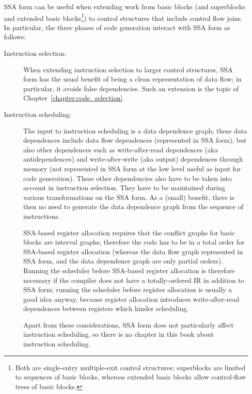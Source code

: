 SSA form can be useful when extending work from basic blocks (and
superblocks and extended basic blocks\footnote{Both are single-entry
  multiple-exit control structures; superblocks are limited to
  sequences of basic blocks, whereas extended basic blocks allow
  control-flow trees of basic blocks.}) to control structures that
include control flow joins.  In particular, the three phases of code
generation interact with SSA form as follows:

\begin{description}

\item[Instruction selection:] When extending instruction selection to
  larger control structures, SSA form has the usual benefit of being a
  clean representation of data flow; in particular, it avoids false
  dependencies.  Such an extension is the topic of
  Chapter~\ref{chapter:code_selection}.

\item[Instruction scheduling:] The input to instruction scheduling is
  a data dependence graph; these data dependences include data flow
  dependences (represented in SSA form), but also other dependences
  such as write-after-read dependences (aka antidependences) and
  write-after-write (aka output) dependences through memory (not
  represented in SSA form at the low level useful as input for code
  generation).  These other dependencies also have to be taken into
  account in instruction selection.  They have to be maintained during
  various transformations on the SSA form.  As a (small) benefit,
  there is then no need to generate the data dependence graph from the
  sequence of instructions.

  SSA-based register allocation requires that the conflict graphs for
  basic blocks are interval graphs; therefore the code has to be in a
  total order for SSA-based register allocation (whereas the data flow
  graph represented in SSA form, and the data dependence graph are
  only partial orders).  Running the scheduler before SSA-based
  register allocation is therefore necessary if the compiler does not
  have a totally-ordered IR in addition to SSA form; running the
  scheduler before register allocation is usually a good idea anyway,
  because register allocation introduces write-after-read dependences
  between registers which hinder scheduling.

  Apart from these considerations, SSA form does not particularly
  affect instruction scheduling, so there is no chapter in this book
  about instruction scheduling.


\end{description}
